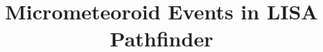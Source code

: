 \documentclass[twocolumn, trackchanges]{aastex62}
\begin{document}
\title{Micrometeoroid Events in LISA Pathfinder}


\end{document}
